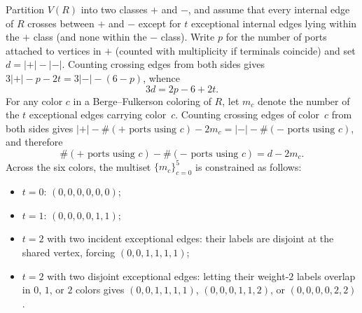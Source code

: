 \documentclass[11pt]{article}
\begin{document}
Partition $V(R)$ into two classes $+$ and $-$, and assume that every internal edge of $R$
crosses between $+$ and $-$ except for $t$ exceptional internal edges lying within the
$+$ class (and none within the $-$ class). Write $p$ for the number of ports attached to
vertices in $+$ (counted with multiplicity if terminals coincide) and set
$d = |+| - |-|$. Counting crossing edges from both sides gives
$3|+| - p - 2t = 3|-| - (6 - p)$, whence
\begin{equation}\label{eq:deg-count}
  3d = 2p - 6 + 2t.
\end{equation}
For any color $c$ in a Berge--Fulkerson coloring of $R$, let $m_c$ denote the number of
the $t$ exceptional edges carrying color~$c$. Counting crossing edges of color~$c$ from
both sides gives $|+| - \#(+\text{ ports using } c) - 2m_c = |-| - \#(-\text{ ports using } c)$,
and therefore
\begin{equation}\label{eq:signed-count}
  \#(+\text{ ports using } c) - \#(-\text{ ports using } c) = d - 2m_c.
\end{equation}
Across the six colors, the multiset $\{m_c\}_{c=0}^{5}$ is constrained as follows:
\begin{itemize}
  \item $t = 0$: $(0,0,0,0,0,0)$;
  \item $t = 1$: $(0,0,0,0,1,1)$;
  \item $t = 2$ with two incident exceptional edges: their labels are disjoint at the
        shared vertex, forcing $(0,0,1,1,1,1)$;
  \item $t = 2$ with two disjoint exceptional edges: letting their weight-$2$ labels
        overlap in $0$, $1$, or $2$ colors gives $(0,0,1,1,1,1)$, $(0,0,0,1,1,2)$, or
        $(0,0,0,0,2,2)$.
\end{itemize}
\end{document}
